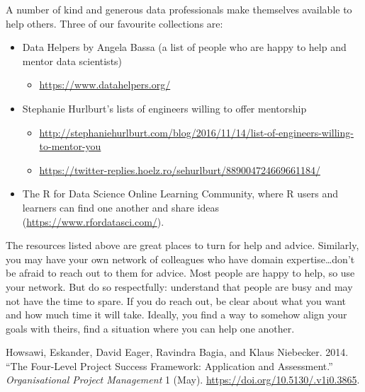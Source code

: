 \documentclass[]{book}
\providecommand{\tightlist}{%
  \setlength{\itemsep}{0pt}\setlength{\parskip}{0pt}}
\begin{document}
A number of kind and generous data professionals make themselves
available to help others. Three of our favourite collections are:

\begin{itemize}
\tightlist
\item
  Data Helpers by Angela Bassa (a list of people who are happy to help
  and mentor data scientists)

  \begin{itemize}
  \tightlist
  \item
    \url{https://www.datahelpers.org/}
  \end{itemize}
\item
  Stephanie Hurlburt's lists of engineers willing to offer mentorship

  \begin{itemize}
  \tightlist
  \item
    \url{http://stephaniehurlburt.com/blog/2016/11/14/list-of-engineers-willing-to-mentor-you}
  \item
    \url{https://twitter-replies.hoelz.ro/sehurlburt/889004724669661184/}
  \end{itemize}
\item
  The R for Data Science Online Learning Community, where R users and
  learners can find one another and share ideas
  (\url{https://www.rfordatasci.com/}).
\end{itemize}

The resources listed above are great places to turn for help and advice.
Similarly, you may have your own network of colleagues who have domain
expertise\ldots{}don't be afraid to reach out to them for advice. Most
people are happy to help, so use your network. But do so respectfully:
understand that people are busy and may not have the time to spare. If
you do reach out, be clear about what you want and how much time it will
take. Ideally, you find a way to somehow align your goals with theirs,
find a situation where you can help one another.

\hypertarget{refs}{}
\leavevmode\hypertarget{ref-Howsawi}{}%
Howsawi, Eskander, David Eager, Ravindra Bagia, and Klaus Niebecker.
2014. ``The Four-Level Project Success Framework: Application and
Assessment.'' \emph{Organisational Project Management} 1 (May).
\url{https://doi.org/10.5130/.v1i0.3865}.
\end{document}
